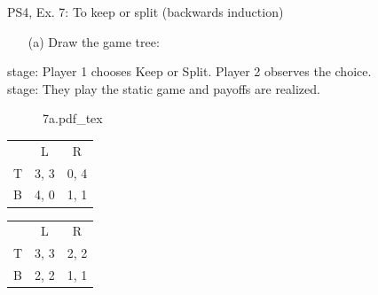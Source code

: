 \begin{frame}{PS4, Ex. 7: To keep or split (backwards induction)}
  \begin{multicols}{2}
    \begin{itemize}
      \item[(a)] Draw the game tree:
    \end{itemize}
     stage: Player 1 chooses Keep or Split. Player 2 observes the choice.\\\medskip
     stage: They play the static game and payoffs are realized.
    \begin{figure}[!h]
      \begin{center}
      \def\svgwidth{.5\columnwidth}
      {7a.pdf_tex}
      \end{center}
    \end{figure}
    \vspace{-12pt}
    \begin{table}
      \begin{tabular}{l|c|c|}
        \multicolumn{1}{c}{} & \multicolumn{1}{c}{L} & \multicolumn{1}{c}{R} \\\cline{2-3}
        T & 3, 3 & 0, 4 \\\cline{2-3}
        B & 4, 0 & 1, 1 \\\cline{2-3}
      \end{tabular}
      \enskip
      \begin{tabular}{l|c|c|}
        \multicolumn{1}{c}{} & \multicolumn{1}{c}{L} & \multicolumn{1}{c}{R} \\\cline{2-3}
        T & 3, 3 & 2, 2 \\\cline{2-3}
        B & 2, 2 & 1, 1 \\\cline{2-3}
      \end{tabular}
    \end{table}
  \vfill\null \columnbreak
  \vfill\null
  \end{multicols}
\end{frame}
